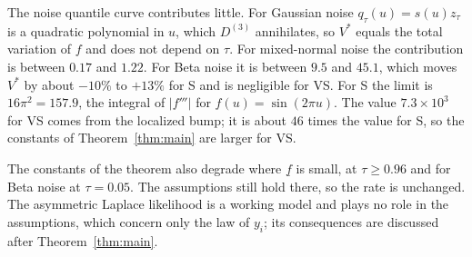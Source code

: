 The noise quantile curve contributes little. For Gaussian noise $q_\tau(u)=s(u)z_\tau$ is a quadratic polynomial in $u$, which $D^{(3)}$ annihilates, so $V^*$ equals the total variation of $f$ and does not depend on $\tau$. For mixed-normal noise the contribution is between $0.17$ and $1.22$. For Beta noise it is between $9.5$ and $45.1$, which moves $V^*$ by about $-10\%$ to $+13\%$ for S and is negligible for VS. For S the limit is $16\pi^2=157.9$, the integral of $|f'''|$ for $f(u)=\sin(2\pi u)$. The value $7.3\times10^3$ for VS comes from the localized bump; it is about $46$ times the value for S, so the constants of Theorem~\ref{thm:main} are larger for VS.

The constants of the theorem also degrade where $\underline f$ is small, at $\tau\ge0.96$ and for Beta noise at $\tau=0.05$. The assumptions still hold there, so the rate is unchanged. The asymmetric Laplace likelihood is a working model and plays no role in the assumptions, which concern only the law of $y_i$; its consequences are discussed after Theorem~\ref{thm:main}.
